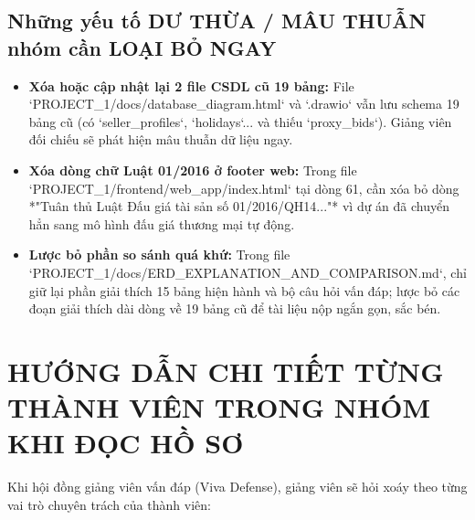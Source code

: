 \documentclass[11pt,a4paper]{article}
\begin{document}
\subsection{Những yếu tố DƯ THỪA / MÂU THUẪN nhóm cần LOẠI BỎ NGAY}
\begin{tcolorbox}[colback=warningred!10,colframe=warningred,title=\textbf{CẢNH BÁO: CÁC ĐIỂM DỄ BỊ TRỪ ĐIỂM DO LỆCH PHA TÀI LIỆU}]
\begin{itemize}[leftmargin=*]
    \item \textbf{Xóa hoặc cập nhật lại 2 file CSDL cũ 19 bảng:} File `PROJECT_1/docs/database_diagram.html` và `.drawio` vẫn lưu schema 19 bảng cũ (có `seller_profiles`, `holidays`... và thiếu `proxy_bids`). Giảng viên đối chiếu sẽ phát hiện mâu thuẫn dữ liệu ngay.
    \item \textbf{Xóa dòng chữ Luật 01/2016 ở footer web:} Trong file `PROJECT_1/frontend/web_app/index.html` tại dòng 61, cần xóa bỏ dòng *"Tuân thủ Luật Đấu giá tài sản số 01/2016/QH14..."* vì dự án đã chuyển hẳn sang mô hình đấu giá thương mại tự động.
    \item \textbf{Lược bỏ phần so sánh quá khứ:} Trong file `PROJECT_1/docs/ERD_EXPLANATION_AND_COMPARISON.md`, chỉ giữ lại phần giải thích 15 bảng hiện hành và bộ câu hỏi vấn đáp; lược bỏ các đoạn giải thích dài dòng về 19 bảng cũ để tài liệu nộp ngắn gọn, sắc bén.
\end{itemize}
\end{tcolorbox}

\section{HƯỚNG DẪN CHI TIẾT TỪNG THÀNH VIÊN TRONG NHÓM KHI ĐỌC HỒ SƠ}

Khi hội đồng giảng viên vấn đáp (Viva Defense), giảng viên sẽ hỏi xoáy theo từng vai trò chuyên trách của thành viên:
\end{document}
